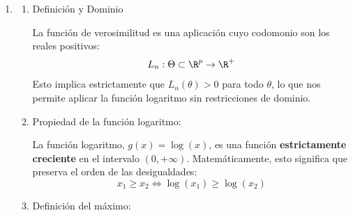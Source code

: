 \begin{enumerate}[label=\color{red}\textbf{\arabic*)}]
\begin{enumerate}[label=\arabic*)]
		            Para una distribución exponencial, la función de densidad es $f_X(x;\lambda)=\lambda e^{-\lambda x}$.

		            Planteamos la función de verosimilitud para la muestra: \[
			            L_n(\lambda)=\prod_{i=1}^{n} \lambda e^{-\lambda x_i} =\lambda^ne^{-\lambda \sum_{n=1}^{n} x_i}
		            \]
		            Para maximizar esta función de forma más sencilla, aplicamos el logaritmo neperiano (log-verosimilitud): \[
			            \ln L_n(\lambda)=\ln \left( \lambda^ne^{-\lambda \sum_{n=1}^{n} x_i} \right) = n\ln(\lambda)-\lambda \sum_{i=1}^{n} x_i
		            \]
		            Derivamos la función respecto a $\lambda$ e igualamos a 0 para hallar el máximo: \[
			            \frac{\partial }{\partial \lambda} \ln L_n(\lambda)=\dfrac{n}{\lambda}-\sum_{i=1}^{n} x_i=0
		            \]
		            Despejamos $\lambda$: \[
			            \dfrac{n}{\lambda}=\sum_{i=1}^{n} x_i \implies \lambda=\dfrac{n}{\sum_{i=1}^{n} x_i}
		            \]
		            Sabiendo que la media muestral es $\bar{X}=\dfrac{\sum x_i}{n}$, podemos sustituir $\sum_{i=1}^{n} x_i$ por $n \bar{X}$: \[
			            \hat{\lambda}_{EMV}=\dfrac{n}{n\bar{X}}=\dfrac{1}{\bar{X}}
		            \]

	      \end{enumerate}
	\item {}

	      \begin{enumerate}[label=\arabic*)]
		      \item Definición y Dominio

		            La función de verosimilitud es una aplicación cuyo codomonio son los reales positivos: \[
			            L_n:\Theta \subset \R^p\to\R^+
		            \] Esto implica estrictamente que $L_n(\theta)>0$ para todo $\theta$, lo que nos permite aplicar la función logaritmo sin restricciones de dominio.
		      \item Propiedad de la función logaritmo:

		            La función logaritmo, $g(x)=\log(x)$, es una función \textbf{estrictamente creciente} en el intervalo $(0,+\infty)$. Matemáticamente, esto significa que preserva el orden de las desigualdades: \[
			            x_1\ge x_2\iff \log(x_1)\ge \log(x_2)
		            \]
		      \item Definición del máximo:


\end{enumerate}
\end{enumerate}
